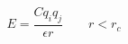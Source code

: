 \documentclass[12pt]{article}
\begin{document}
$$
  E = \frac{C q_i q_j}{\epsilon  r} \qquad r < r_c
$$
\end{document}
